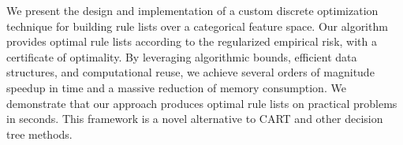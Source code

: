 We present the design and implementation of a custom discrete optimization
technique for building rule lists over a categorical feature space.
%
Our algorithm provides optimal rule lists according to the regularized empirical risk,
with a certificate of optimality.
%
By leveraging algorithmic bounds, efficient data structures,
and computational reuse, we achieve several orders of magnitude speedup in time
and a massive reduction of memory consumption.
%
We demonstrate that our approach produces optimal rule lists on practical
problems in seconds.
%
This framework is a novel alternative to CART and other decision tree methods.
